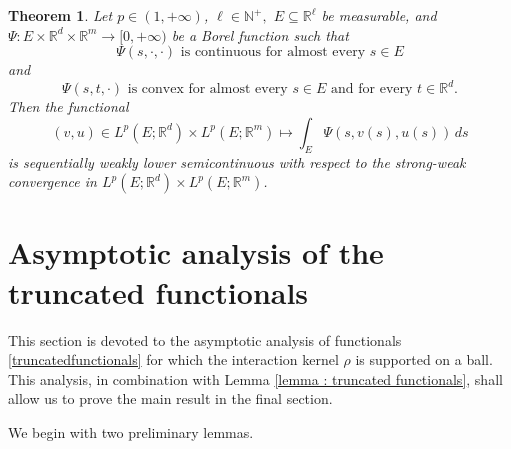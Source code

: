 \documentclass{article}
\newtheorem{theorem}[lemma]{Theorem}
\theoremstyle{definition}
\newcommand{\N}{\mathbb{N}}
\newcommand{\R}{\mathbb{R}}
\begin{document}
\begin{theorem}\label{thm : LSC}
    Let $p\in(1,+\infty)$, $\ell\in \N^+,$ $E\subseteq \R^\ell$ be measurable,
and $\Psi: E\times \R^d\times \R^m\to[0,+\infty)$ be a Borel function such that
\begin{equation*}
    \Psi(s,\cdot,\cdot) \text{ is continuous for almost every } s\in E
\end{equation*}
and 
\begin{equation*}
    \Psi(s,t,\cdot) \text{ is convex for almost every } s\in E \text{ and for every } t\in\R^d.
\end{equation*}
Then the functional
\begin{equation*}
    (v,u)\in L^p(E; \R^d)\times L^p(E; \R^m)\mapsto \int_{E} \Psi(s,v(s), u(s))\,ds
\end{equation*}
is sequentially weakly lower semicontinuous with respect to the strong-weak convergence in $L^p(E; \R^d)\times L^p(E; \R^m)$.
\end{theorem}

\section{Asymptotic analysis of the truncated functionals}

This section is devoted to the asymptotic analysis of functionals \eqref{truncatedfunctionals} for which the interaction kernel $\rho$ is supported on a ball. This analysis, in combination with Lemma \ref{lemma : truncated functionals}, shall allow us to prove the main result in the final section.

We begin with two preliminary lemmas.
\end{document}
